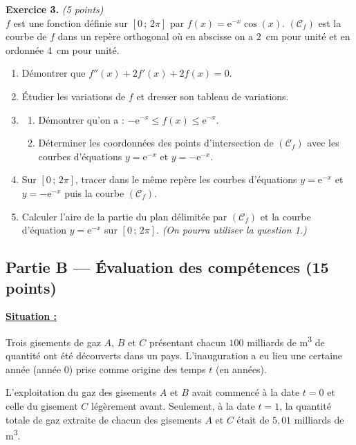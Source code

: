 \smallskip
\noindent\textbf{Exercice 3.} \hfill\textit{(5 points)}\\
$f$ est une fonction définie sur $[0\,;\,2\pi]$ par $f(x)=\mathrm{e}^{-x}\cos(x)$. $(\mathcal{C}_f)$ est
la courbe de $f$ dans un repère orthogonal où en abscisse on a $2$~cm pour unité et en
ordonnée $4$~cm pour unité.
\begin{enumerate}[label=\arabic*)]
\item Démontrer que $f''(x)+2f'(x)+2f(x)=0$.
\item Étudier les variations de $f$ et dresser son tableau de variations.
\item \begin{enumerate}[label=\textbf{\alph*.}]
  \item Démontrer qu'on a : $-\mathrm{e}^{-x}\le f(x)\le\mathrm{e}^{-x}$.
  \item Déterminer les coordonnées des points d'intersection de $(\mathcal{C}_f)$ avec les courbes
    d'équations $y=\mathrm{e}^{-x}$ et $y=-\mathrm{e}^{-x}$.
  \end{enumerate}
\item Sur $[0\,;\,2\pi]$, tracer dans le même repère les courbes d'équations $y=\mathrm{e}^{-x}$ et
  $y=-\mathrm{e}^{-x}$ puis la courbe $(\mathcal{C}_f)$.
\item Calculer l'aire de la partie du plan délimitée par $(\mathcal{C}_f)$ et la courbe d'équation
  $y=\mathrm{e}^{-x}$ sur $[0\,;\,2\pi]$. \textit{(On pourra utiliser la question 1.)}
\end{enumerate}

\subsection*{Partie B — Évaluation des compétences \hfill (15 points)}
\noindent\textbf{\underline{Situation :}}

\smallskip
\noindent Trois gisements de gaz $A$, $B$ et $C$ présentant chacun $100$ milliards de m\textsuperscript{3}
de quantité ont été découverts dans un pays. L'inauguration a eu lieu une certaine année
(année $0$) prise comme origine des temps $t$ (en années).

L'exploitation du gaz des gisements $A$ et $B$ avait commencé à la date $t=0$ et celle du
gisement $C$ légèrement avant. Seulement, à la date $t=1$, la quantité totale de gaz extraite
de chacun des gisements $A$ et $C$ était de $5{,}01$ milliards de m\textsuperscript{3}.

